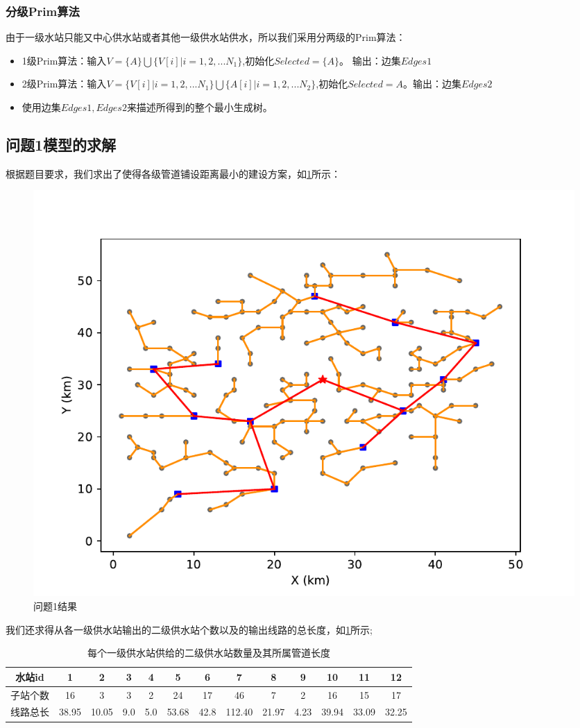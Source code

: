 \documentclass{cumcmthesis}
\begin{document}
\subsubsection{分级Prim算法}
由于一级水站只能又中心供水站或者其他一级供水站供水，所以我们采用分两级的Prim算法：
\begin{itemize}
  \item 1级Prim算法：输入$V = \{A\}\bigcup \{ V[i]|i=1,2,...N_1\}$,初始化$Selected = \{A\}$。
  输出：边集$Edges1$

  \item 2级Prim算法：输入$V = \{V[i]|i=1,2,...N_1\} \bigcup \{A[i]|i=1,2,...N_2\}$,初始化$Selected = {A}$。输出：边集$Edges2$
  \item 使用边集$Edges1, Edges2$来描述所得到的整个最小生成树。
\end{itemize}
\subsection{问题1模型的求解}
  根据题目要求，我们求出了使得各级管道铺设距离最小的建设方案，如\cref{fig:solution1}所示：
  \begin{figure}[!h]
    \centering
    \includegraphics[width=.9\textwidth]{figure/pipeline.pdf}
    \caption{问题1结果}
    \label{fig:solution1}
  \end{figure}

我们还求得从各一级供水站输出的二级供水站个数以及的输出线路的总长度，如\cref{tab:001}所示;

\begin{table}[!h]
  \caption{每个一级供水站供给的二级供水站数量及其所属管道长度}\label{tab:001} \centering
  \begin{tabular}{ccccccccccccc}
      \toprule[1.5pt]
      水站id & 1 & 2 & 3 & 4 & 5 & 6 & 7 & 8 & 9 & 10 & 11 & 12\\
      \midrule[1pt]
      子站个数&16 & 3 & 3 & 2 & 24 & 17 & 46 & 7 & 2 & 16 & 15 & 17 \\
      线路总长&38.95 & 10.05 & 9.0 & 5.0 & 53.68 & 42.8 & 112.40 & 21.97 & 4.23 & 39.94 & 33.09 &32.25  \\
      \bottomrule[1.5pt]
  \end{tabular}
\end{table}
\end{document}
